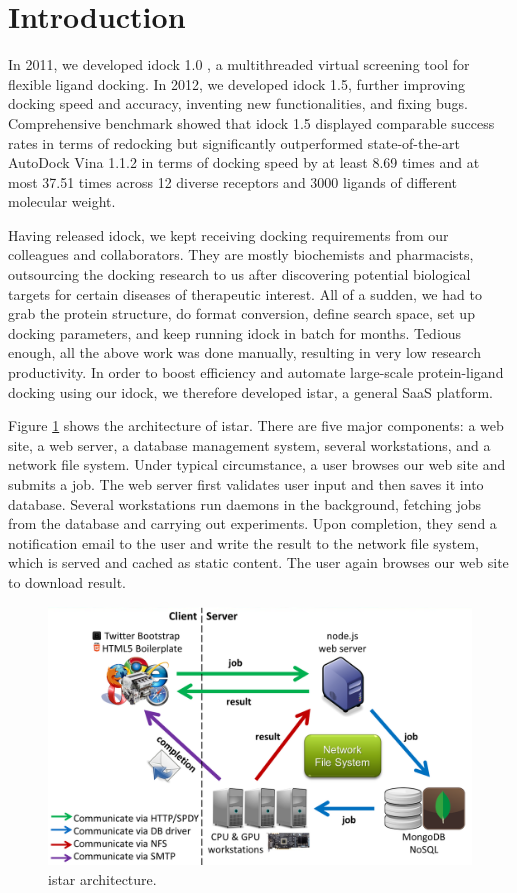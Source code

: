 \documentclass{bioinfo}
\begin{document}
\section{Introduction}

In 2011, we developed idock 1.0 \citep{1153}, a multithreaded virtual screening tool for flexible ligand docking. In 2012, we developed idock 1.5, further improving docking speed and accuracy, inventing new functionalities, and fixing bugs. Comprehensive benchmark showed that idock 1.5 displayed comparable success rates in terms of redocking but significantly outperformed state-of-the-art AutoDock Vina 1.1.2 \citep{595} in terms of docking speed by at least 8.69 times and at most 37.51 times across 12 diverse receptors and 3000 ligands of different molecular weight.

Having released idock, we kept receiving docking requirements from our colleagues and collaborators. They are mostly biochemists and pharmacists, outsourcing the docking research to us after discovering potential biological targets for certain diseases of therapeutic interest. All of a sudden, we had to grab the protein structure, do format conversion, define search space, set up docking parameters, and keep running idock in batch for months. Tedious enough, all the above work was done manually, resulting in very low research productivity. In order to boost efficiency and automate large-scale protein-ligand docking using our idock, we therefore developed istar, a general SaaS platform.

Figure \ref{istar:architecture} shows the architecture of istar. There are five major components: a web site, a web server, a database management system, several workstations, and a network file system. Under typical circumstance, a user browses our web site and submits a job. The web server first validates user input and then saves it into database. Several workstations run daemons in the background, fetching jobs from the database and carrying out experiments. Upon completion, they send a notification email to the user and write the result to the network file system, which is served and cached as static content. The user again browses our web site to download result.

\begin{figure}
\centerline{\includegraphics[width=\linewidth]{Architecture.png}}
\caption{istar architecture.}\label{istar:architecture}
\end{figure}
\end{document}
